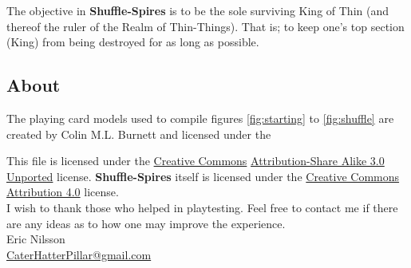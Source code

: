 \documentclass[11pt,twocolumn]{article}
\begin{document}
The objective in \textbf{Shuffle-Spires} is to be the sole surviving King of Thin (and thereof the ruler of the Realm of Thin-Things).
That is; to keep one’s top section (King) from being destroyed for as long as possible.

\subsection{About}
\label{sec:about}
The playing card models used to compile figures \ref{fig:starting} to \ref{fig:shuffle} are created by Colin M.L. Burnett and licensed under the 

This file is licensed under the \href{http://en.wikipedia.org/wiki/en:Creative_Commons}{Creative Commons} \href{http://creativecommons.org/licenses/by-sa/3.0/deed.en}{Attribution-Share Alike 3.0 Unported} license.
\textbf{Shuffle-Spires} itself is licensed under the \href{http://en.wikipedia.org/wiki/en:Creative_Commons}{Creative Commons} \href{http://creativecommons.org/licenses/by/4.0/}{Attribution 4.0} license.\\

\noindent
I wish to thank those who helped in playtesting.
Feel free to contact me if there are any ideas as to how one may improve the experience.\\

\noindent
Eric Nilsson \\
\href{mailto:CaterHatterPillar@gmail.com}{CaterHatterPillar@gmail.com}
\end{document}
